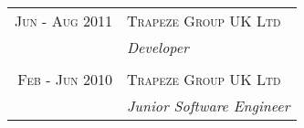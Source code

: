 \begin{tabular}{r|p{11cm}}

\textsc{Jun - Aug 2011} & \textsc{Trapeze Group UK Ltd}\\ 
& \emph{Developer}\\

\multicolumn{2}{c}{} \\


\textsc{Feb - Jun 2010} & \textsc{Trapeze Group UK Ltd}\\ 
& \emph{Junior Software Engineer}\\

\end{tabular}